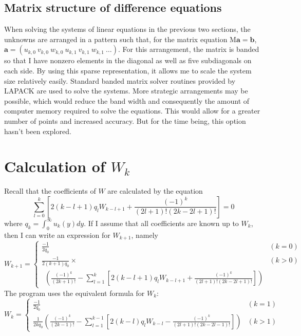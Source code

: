 \documentclass[10pt,a4paper]{report}
\begin{document}
\subsection{Matrix structure of difference equations}

When solving the systems of linear equations in the previous two sections, the unknowns are arranged in a pattern such that, for the matrix equation $\textrm{M} \bm{a} = \bm{b}$, $\bm{a} = \left( u_{k,0} \ v_{k,0} \ w_{k,0} \ u_{k,1} \ v_{k,1} \ w_{k,1} \ \dotsc \right)$. For this arrangement, the matrix is banded so that I have nonzero elements in the diagonal as well as five subdiagonals on each side. By using this sparse representation, it allows me to scale the system size relatively easily. Standard banded matrix solver routines provided by LAPACK are used to solve the systems. More strategic arrangements may be possible, which would reduce the band width and consequently the amount of computer memory required to solve the equations. This would allow for a greater number of points and increased accuracy. But for the time being, this option hasn't been explored.

\section{Calculation of $W_k$}

Recall that the coefficients of $W$ are calculated by the equation
\begin{equation*}
\sum_{l=0}^k \left[ 2(k-l+1) q_l W_{k-l+1} + \frac{(-1)^k}{(2l+1)! (2k-2l+1)!} \right] = 0
\end{equation*}
where $q_k = \int_0^\infty u_k(y) dy$. If I assume that all coefficients are known up to $W_k$, then I can write an expression for $W_{k+1}$, namely
\begin{equation*}
W_{k+1} =
\begin{cases}
\frac{-1}{2 q_0} & \! \! \! \! \! \! \! (k = 0) \\
\frac{-1}{2(k+1) q_0} \times & \! \! \! \! \! \! \! (k > 0) \\
\ \ \left( \frac{(-1)^k}{(2k+1)!} - \sum_{l=1}^k \left[ 2(k-l+1)q_l W_{k-l+1} + \frac{(-1)^k}{(2l+1)! (2k-2l+1)!}\right] \right) &
\end{cases}
\end{equation*}
The program uses the equivalent formula for $W_k$:
\begin{equation}
W_k =
\begin{cases}
\frac{-1}{2 q_0} & (k = 1) \\
\frac{1}{2k q_0} \left( \frac{(-1)^k}{(2k-1)!} - \sum_{l=1}^{k-1} \left[ 2(k-l)q_l W_{k-l} - \frac{(-1)^k}{(2l+1)! (2k-2l-1)!}\right] \right) & (k > 1)
\end{cases}
\end{equation}
\end{document}
